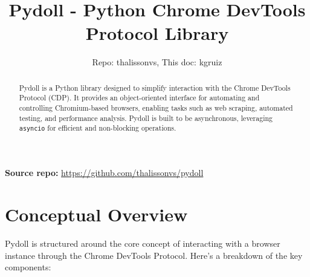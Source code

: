 \documentclass{article}
\title{Pydoll - Python Chrome DevTools Protocol Library}
\author{Repo: thalissonvs, This doc: kgruiz}
\date{}
\begin{document}
\maketitle

\noindent\textbf{Source repo:} \url{https://github.com/thalissonvs/pydoll}

\begin{abstract}
    Pydoll is a Python library designed to simplify interaction with the Chrome DevTools Protocol (CDP). It provides an object-oriented interface for automating and controlling Chromium-based browsers, enabling tasks such as web scraping, automated testing, and performance analysis. Pydoll is built to be asynchronous, leveraging \lstinline[style=pythonstyle]|asyncio| for efficient and non-blocking operations.
\end{abstract}

\newpage

\tableofcontents

\newpage

\section{Conceptual Overview}

\noindent Pydoll is structured around the core concept of interacting with a browser instance through the Chrome DevTools Protocol. Here's a breakdown of the key components:
\end{document}
